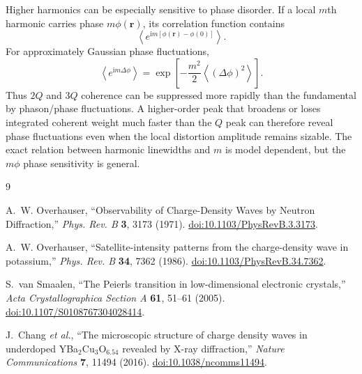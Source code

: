 \documentclass[11pt]{article}
\newcommand{\ii}{\mathrm{i}}
\newcommand{\br}{\mathbf{r}}
\begin{document}
Higher harmonics can be especially sensitive to phase disorder.  If a local $m$th harmonic carries phase $m\phi(\br)$, its correlation function contains
\begin{equation}
    \left\langle e^{\ii m[\phi(\br)-\phi(0)]}\right\rangle.
\end{equation}
For approximately Gaussian phase fluctuations,
\begin{equation}
    \left\langle e^{\ii m\Delta\phi}\right\rangle
    =\exp\left[-\frac{m^2}{2}\left\langle(\Delta\phi)^2\right\rangle\right].
\end{equation}
Thus $2Q$ and $3Q$ coherence can be suppressed more rapidly than the fundamental by phason/phase fluctuations.  A higher-order peak that broadens or loses integrated coherent weight much faster than the $Q$ peak can therefore reveal phase fluctuations even when the local distortion amplitude remains sizable.  The exact relation between harmonic linewidths and $m$ is model dependent, but the $m\phi$ phase sensitivity is general.

\begin{thebibliography}{9}

A.~W. Overhauser,
``Observability of Charge-Density Waves by Neutron Diffraction,''
\emph{Phys. Rev. B} \textbf{3}, 3173 (1971).
\href{https://doi.org/10.1103/PhysRevB.3.3173}{doi:10.1103/PhysRevB.3.3173}.

A.~W. Overhauser,
``Satellite-intensity patterns from the charge-density wave in potassium,''
\emph{Phys. Rev. B} \textbf{34}, 7362 (1986).
\href{https://doi.org/10.1103/PhysRevB.34.7362}{doi:10.1103/PhysRevB.34.7362}.

S.~van Smaalen,
``The Peierls transition in low-dimensional electronic crystals,''
\emph{Acta Crystallographica Section A} \textbf{61}, 51--61 (2005).
\href{https://doi.org/10.1107/S0108767304028414}{doi:10.1107/S0108767304028414}.

J.~Chang \emph{et al.},
``The microscopic structure of charge density waves in underdoped YBa$_2$Cu$_3$O$_{6.54}$ revealed by X-ray diffraction,''
\emph{Nature Communications} \textbf{7}, 11494 (2016).
\href{https://doi.org/10.1038/ncomms11494}{doi:10.1038/ncomms11494}.

\end{thebibliography}
\end{document}
